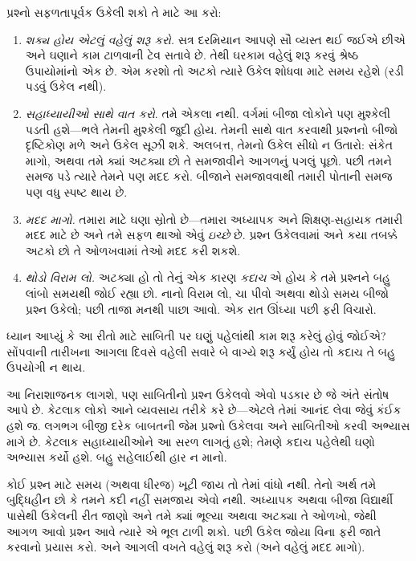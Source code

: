 પ્રશ્નો સફળતાપૂર્વક ઉકેલી શકો તે માટે આ કરો:
\begin{enumerate}
\item \emph{શક્ય હોય એટલું વહેલું શરૂ કરો.} સત્ર દરમિયાન
  આપણે સૌ વ્યસ્ત થઈ જઈએ છીએ અને ઘણાને કામ ટાળવાની ટેવ
  સતાવે છે. તેથી ઘરકામ વહેલું શરૂ કરવું શ્રેષ્ઠ ઉપાયોમાંનો
  એક છે. એમ કરશો તો અટકો ત્યારે ઉકેલ શોધવા માટે સમય
  રહેશે (રડી પડવું ઉકેલ નથી).
\item \emph{સહાધ્યાયીઓ સાથે વાત કરો}. તમે એકલા નથી.
  વર્ગમાં બીજા લોકોને પણ મુશ્કેલી પડતી હશે---ભલે તેમની
  મુશ્કેલી જુદી હોય. તેમની સાથે વાત કરવાથી પ્રશ્નનો બીજો
  દૃષ્ટિકોણ મળે અને ઉકેલ સૂઝી શકે. અલબત્ત, તેમનો ઉકેલ
  સીધો ન ઉતારો: સંકેત માગો, અથવા તમે ક્યાં અટક્યા છો તે
  સમજાવીને આગળનું પગલું પૂછો. પછી તમને સમજ પડે ત્યારે
  તેમને પણ મદદ કરો. બીજાને સમજાવવાથી તમારી પોતાની
  સમજ પણ વધુ સ્પષ્ટ થાય છે.
\item \emph{મદદ માગો.} તમારા માટે ઘણા સ્રોતો છે---તમારા
  અધ્યાપક અને શિક્ષણ-સહાયક તમારી મદદ માટે છે અને તમે
  સફળ થાઓ એવું \emph{ઇચ્છે} છે. પ્રશ્ન ઉકેલવામાં અને
  કયા તબક્કે અટકો છો તે ઓળખવામાં તેઓ મદદ કરી શકશે.
\item \emph{થોડો વિરામ લો.} અટક્યા હો તો તેનું એક કારણ
  \emph{કદાચ} એ હોય કે તમે પ્રશ્નને બહુ લાંબો સમયથી જોઈ રહ્યા છો.
  નાનો વિરામ લો, ચા પીવો અથવા થોડો સમય બીજો પ્રશ્ન
  ઉકેલો; પછી તાજા મનથી પાછા આવો. એક રાત ઊંઘ્યા પછી
  ફરી વિચારો.
\end{enumerate}

ધ્યાન આપ્યું કે આ રીતો માટે સાબિતી પર ઘણું પહેલાંથી કામ
શરૂ કરેલું હોવું જોઈએ? સોંપવાની તારીખના આગલા દિવસે
વહેલી સવારે બે વાગ્યે શરૂ કર્યું હોય તો કદાચ તે બહુ
ઉપયોગી ન થાય.

આ નિરાશાજનક લાગશે, પણ સાબિતીનો પ્રશ્ન ઉકેલવો એવો પડકાર
છે જે અંતે સંતોષ આપે છે. કેટલાક લોકો આને વ્યવસાય તરીકે
કરે છે---એટલે તેમાં આનંદ લેવા જેવું કંઈક હશે જ. લગભગ
બીજી દરેક બાબતની જેમ પ્રશ્નો ઉકેલવા અને સાબિતીઓ કરવી
અભ્યાસ માગે છે. કેટલાક સહાધ્યાયીઓને આ સરળ લાગતું હશે;
તેમણે કદાચ પહેલેથી ઘણો અભ્યાસ કર્યો હશે. બહુ સહેલાઈથી
હાર ન માનો.

કોઈ પ્રશ્ન માટે સમય (અથવા ધીરજ) ખૂટી જાય તો તેમાં વાંધો
નથી. તેનો અર્થ તમે બુદ્ધિહીન છો કે તમને કદી નહીં સમજાય
એવો નથી. અધ્યાપક અથવા બીજા વિદ્યાર્થી પાસેથી ઉકેલની
રીત જાણો અને તમે ક્યાં ભૂલ્યા અથવા અટક્યા તે ઓળખો,
જેથી આગળ આવો પ્રશ્ન આવે ત્યારે એ ભૂલ ટાળી શકો. પછી
ઉકેલ જોયા વિના ફરી જાતે કરવાનો પ્રયાસ કરો. અને આગલી
વખતે વહેલું શરૂ કરો (અને વહેલું મદદ માગો).
\endgroup


\begingroup
\makeatletter{}\makeatother


